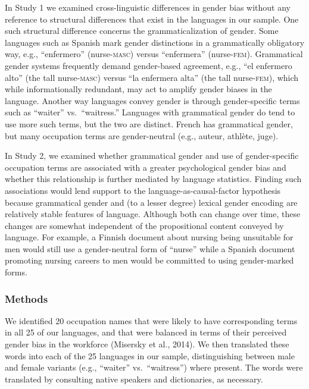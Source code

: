 \documentclass[man,floatsintext]{apa6}
\begin{document}
In Study 1 we examined cross-linguistic differences in gender bias without any reference to structural differences that exist in the languages in our sample. One such structural difference concerns the grammaticalization of gender. Some languages such as Spanish mark gender distinctions in a grammatically obligatory way, e.g., \enquote{enfermero} (nurse-\textsc{masc}) versus \enquote{enfermera} (nurse-\textsc{fem}). Grammatical gender systems frequently demand gender-based agreement, e.g., \enquote{el enfermero alto} (the tall nurse-\textsc{masc}) versus \enquote{la enfermera alta} (the tall nurse-\textsc{fem}), which while informationally redundant, may act to amplify gender biases in the language. Another way languages convey gender is through gender-specific terms such as \enquote{waiter} vs.~\enquote{waitress.} Languages with grammatical gender do tend to use more such terms, but the two are distinct. French has grammatical gender, but many occupation terms are gender-neutral (e.g., auteur, athlète, juge).

In Study 2, we examined whether grammatical gender and use of gender-specific occupation terms are associated with a greater psychological gender bias and whether this relationship is further mediated by language statistics. Finding such associations would lend support to the language-as-causal-factor hypothesis because grammatical gender and (to a lesser degree) lexical gender encoding are relatively stable features of language. Although both can change over time, these changes are somewhat independent of the propositional content conveyed by language. For example, a Finnish document about nursing being unsuitable for men would still use a gender-neutral form of \enquote{nurse} while a Spanish document promoting nursing careers to men would be committed to using gender-marked forms.

\hypertarget{methods-2}{%
\subsubsection{Methods}\label{methods-2}}

We identified 20 occupation names that were likely to have corresponding terms in all 25 of our languages,
and that were balanced in terms of their perceived gender bias in the workforce (Misersky et al., 2014). We then translated these words into each of the 25 languages in our sample, distinguishing between male and female variants (e.g., \enquote{waiter} vs.~\enquote{waitress}) where present. The words were translated by consulting native speakers and dictionaries, as necessary.
\end{document}
